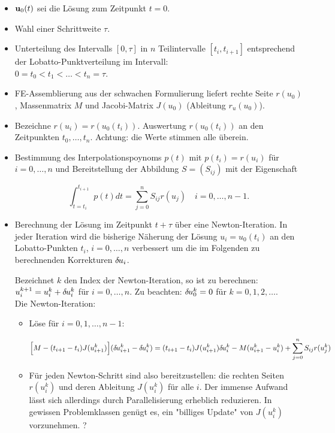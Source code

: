 \documentclass[10pt,twoside,a4paper, openany]{article}
\newcommand{\du}{\delta\hspace{-1pt}u}
\begin{document}
\begin{itemize}
\item ${\bf u}_0(t)$ sei die Lösung zum Zeitpunkt $t = 0$.

\item Wahl einer Schrittweite $\tau$.

\item Unterteilung des Intervalls $[0,\tau]$ in $n$ Teilintervalle $[t_i,t_{i+1}]$ entsprechend der Lobatto-Punktverteilung 
im Intervall:\\
      $0 = t_0 < t_1 < \dots < t_n = \tau$.
   
\item FE-Assemblierung aus der schwachen Formulierung liefert rechte Seite $r(u_0)$, Massenmatrix $M$ und Jacobi-Matrix $J(u_0)$
(Ableitung $r_u(u_0)$).

\item Bezeichne $r(u_i) = r(u_0(t_i))$. Auswertung $r(u_0(t_i))$ an den Zeitpunkten $t_0, \dots, t_n$. Achtung: die Werte stimmen alle überein.

\item Bestimmung des Interpolationspoynoms $p(t)$ mit $p(t_i) = r(u_i)$ für $i=0,\dots, n$
und Bereitstellung der Abbildung $S = (S_{ij})$ mit der Eigenschaft

\[
\int_{t=t_i}^{t_{i+1}} p(t)dt = \sum_{j=0}^{n} S_{ij}r(u_j)  \quad i=0,\dots, n-1.
\]

\item Berechnung der Lösung im Zeitpunkt $t+\tau$ über eine Newton-Iteration. In jeder
Iteration wird die bisherige Näherung der Lösung $u_i = u_0(t_i)$ an den Lobatto-Punkten $t_i$, $i=0,\dots, n$
verbessert um die im Folgenden zu berechnenden Korrekturen ${\du}_i$.

Bezeichnet $k$ den Index der Newton-Iteration, so ist zu berechnen: $u_i^{k+1} = u_i^{k} + \du_i^k$ für $i=0,\dots,n$.
Zu beachten: $\du_0^k = 0$ für $k = 0,1,2,\dots$.\\
Die Newton-Iteration:

\begin{itemize}
\item Löse für $i=0,1,\dots, n-1$:

\[
\Big[ M - (t_{i+1}-t_i) J(u_{i+1}^k) \Big] (\du_{i+1}^k - \du_{i}^k) = (t_{i+1}-t_i) J(u_{i+1}^k)\du_i^k - M(u_{i+1}^k-u_{i}^k) + \sum_{j=0}^{n} S_{ij}r(u_j^k)
\]

\item Für jeden Newton-Schritt sind also bereitzustellen: die rechten Seiten $r(u_i^k)$ und deren Ableitung $J(u_{i}^k)$ für alle $i$.
Der immense Aufwand lässt sich allerdings durch Parallelisierung erheblich reduzieren. 
In gewissen Problemklassen genügt es, ein "billiges Update" von $J(u_{i}^k)$ vorzunehmen. ?


\end{itemize}
\end{itemize}
\end{document}
